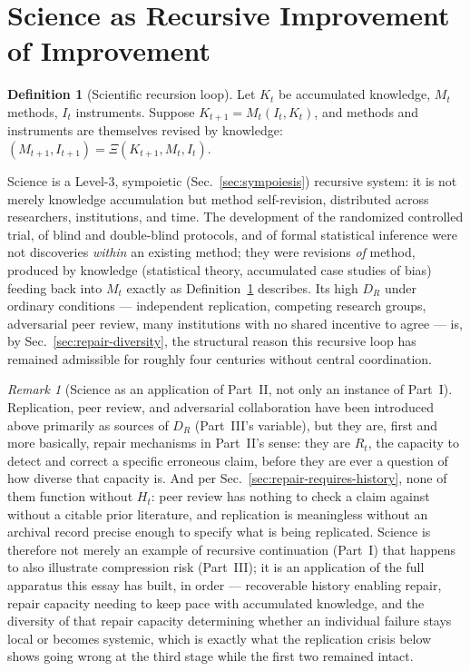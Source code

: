 \documentclass[11pt,a4paper]{article}
\theoremstyle{plain}
\theoremstyle{definition}
\newtheorem{definition}[theorem]{Definition}
\theoremstyle{remark}
\newtheorem{remark}[theorem]{Remark}
\newcommand{\DR}{D_R}
\begin{document}
\section{Science as Recursive Improvement of Improvement}
\label{sec:science}

\begin{definition}[Scientific recursion loop]
\label{def:science-loop}
Let $K_t$ be accumulated knowledge, $M_t$ methods, $I_t$ instruments. Suppose $K_{t+1} = M_t(I_t, K_t)$, and methods and instruments are themselves revised by knowledge: $(M_{t+1}, I_{t+1}) = \Xi(K_{t+1}, M_t, I_t)$.
\end{definition}

Science is a Level-3, sympoietic (Sec.~\ref{sec:sympoiesis}) recursive system: it is not merely knowledge accumulation but method self-revision, distributed across researchers, institutions, and time. The development of the randomized controlled trial, of blind and double-blind protocols, and of formal statistical inference were not discoveries \emph{within} an existing method; they were revisions \emph{of} method, produced by knowledge (statistical theory, accumulated case studies of bias) feeding back into $M_t$ exactly as Definition~\ref{def:science-loop} describes. Its high $\DR$ under ordinary conditions — independent replication, competing research groups, adversarial peer review, many institutions with no shared incentive to agree — is, by Sec.~\ref{sec:repair-diversity}, the structural reason this recursive loop has remained admissible for roughly four centuries without central coordination.

\begin{remark}[Science as an application of Part~II, not only an instance of Part~I]
\label{rem:science-as-repair}
Replication, peer review, and adversarial collaboration have been introduced above primarily as sources of $\DR$ (Part~III's variable), but they are, first and more basically, repair mechanisms in Part~II's sense: they are $R_t$, the capacity to detect and correct a specific erroneous claim, before they are ever a question of how diverse that capacity is. And per Sec.~\ref{sec:repair-requires-history}, none of them function without $H_t$: peer review has nothing to check a claim against without a citable prior literature, and replication is meaningless without an archival record precise enough to specify what is being replicated. Science is therefore not merely an example of recursive continuation (Part~I) that happens to also illustrate compression risk (Part~III); it is an application of the full apparatus this essay has built, in order — recoverable history enabling repair, repair capacity needing to keep pace with accumulated knowledge, and the diversity of that repair capacity determining whether an individual failure stays local or becomes systemic, which is exactly what the replication crisis below shows going wrong at the third stage while the first two remained intact.
\end{remark}
\end{document}
